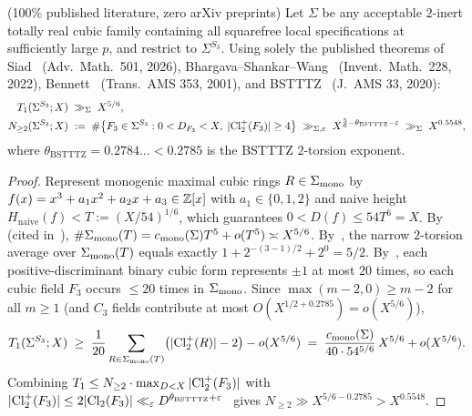 \begin{theorem}\label{thm:4:zero-preprint}
\tagProved{} \textup{(100\% published literature, zero arXiv preprints)}
Let $\Sigma$ be any acceptable $2$-inert totally real cubic family containing all squarefree local specifications at sufficiently large $p$, and restrict to $\Sigma^{S_3}$. Using solely the published theorems of Siad~\cite{Siad2026} (Adv.\ Math.\ 501, 2026), Bhargava--Shankar--Wang~\cite{BSW2022} (Invent.\ Math.\ 228, 2022), Bennett~\cite{Bennett2001} (Trans.\ AMS 353, 2001), and BSTTTZ~\cite{BSTTTZ2020} (J.\ AMS 33, 2020):
\begin{equation}\label{eq:4:T1}
\begin{aligned}
  T_1(\Sigma^{S_3}; X) &\;\gg_\Sigma\; X^{5/6},\\
  N_{\ge 2}(\Sigma^{S_3}; X) &\;:=\; \#\bigl\{F_3 \in \Sigma^{S_3} : 0 < D_{F_3} < X,\; |\mathrm{Cl}_2^+(F_3)| \ge 4\bigr\} \;\gg_{\Sigma,\varepsilon}\; X^{\frac{5}{6} - \theta_{\mathrm{BSTTTZ}} - \varepsilon} \;\gg_\Sigma\; X^{0.5548},
\end{aligned}
\end{equation}
where $\theta_{\mathrm{BSTTTZ}} = 0.2784\ldots < 0.2785$ is the BSTTTZ $2$-torsion exponent.
\end{theorem}
\begin{proof}
Represent monogenic maximal cubic rings $R \in \Sigma_{\mathrm{mono}}$ by $f(x) = x^3 + a_1 x^2 + a_2 x + a_3 \in \mathbb{Z}[x]$ with $a_1 \in \{0,1,2\}$ and naive height $H_{\mathrm{naive}}(f) < T := (X/54)^{1/6}$, which guarantees $0 < D(f) \le 54 T^6 = X$. By~\cite{BSW2022} (cited in~\cite[Thm.~2.2]{Siad2026}), $\#\Sigma_{\mathrm{mono}}(T) = c_{\mathrm{mono}}(\Sigma) T^5 + o(T^5) \asymp X^{5/6}$. By~\cite[Thm.~1.1 \& fn.~3]{Siad2026}, the narrow $2$-torsion average over $\Sigma_{\mathrm{mono}}(T)$ equals exactly $1 + 2^{-(3-1)/2} + 2^0 = 5/2$. By~\cite[Thm.~1.1]{Bennett2001}, each positive-discriminant binary cubic form represents $\pm 1$ at most $20$ times, so each cubic field $F_3$ occurs $\le 20$ times in $\Sigma_{\mathrm{mono}}$. Since $\max(m-2, 0) \ge m - 2$ for all $m \ge 1$ (and $C_3$ fields contribute at most $O(X^{1/2 + 0.2785}) = o(X^{5/6})$),
\[
  T_1(\Sigma^{S_3}; X) \;\ge\; \frac{1}{20}\sum_{R \in \Sigma_{\mathrm{mono}}(T)} \bigl(|\mathrm{Cl}_2^+(R)| - 2\bigr) - o(X^{5/6}) \;=\; \frac{c_{\mathrm{mono}}(\Sigma)}{40 \cdot 54^{5/6}}\,X^{5/6} + o(X^{5/6}).
\]
Combining $T_1 \le N_{\ge 2} \cdot \max_{D < X} |\mathrm{Cl}_2^+(F_3)|$ with $|\mathrm{Cl}_2^+(F_3)| \le 2|\mathrm{Cl}_2(F_3)| \ll_\varepsilon D^{\theta_{\mathrm{BSTTTZ}}+\varepsilon}$~\cite{BSTTTZ2020} gives $N_{\ge 2} \gg X^{5/6 - 0.2785} > X^{0.5548}$.
\end{proof}

